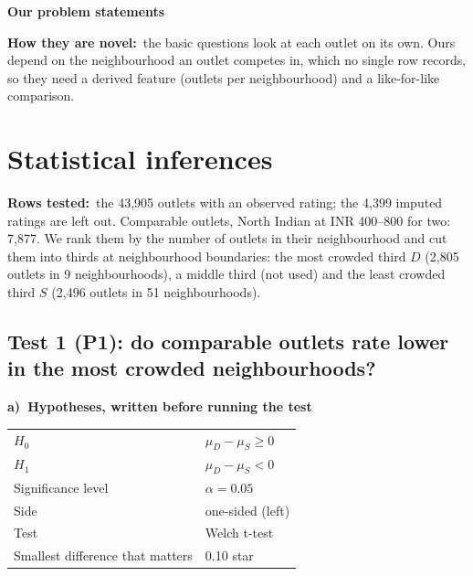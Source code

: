 \documentclass[10pt,a4paper,twocolumn]{article}
\newif\ifshowhints
\newcommand{\hint}[1]{\ifshowhints{\footnotesize\itshape\color{hintgrey}#1\par}\fi}
\newcommand{\eg}[1]{\textcolor{eg}{#1}}
\newcommand{\field}[2]{\textbf{#1}~\eg{#2}\par}
\newcommand{\tpart}[2]{\par\needspace{12\baselineskip}\smallskip\textbf{#1)~#2}\par}
\newcommand{\minihead}[1]{\par\needspace{8\baselineskip}\smallskip\textbf{#1}\par}
\begin{document}
\minihead{Our problem statements}
\hint{One or two sentences each, specific to your features, and phrased so each could come out
either way. Mark one as primary.}

\noindent\fbox{\begin{minipage}{\dimexpr\linewidth-2\fboxsep-2\fboxrule\relax}
\textbf{P1 (primary).} \eg{Among restaurants with comparable cost and cuisine, does rating fall
as the number of competing outlets in the same neighbourhood rises?}

\smallskip
\textbf{P2.} \eg{Within the most crowded neighbourhoods, do outlets that take online orders rate
higher than those that do not?}
\end{minipage}}

\field{How they are novel:}{the basic questions look at each outlet on its own. Ours depend on
the neighbourhood an outlet competes in, which no single row records, so they need a derived
feature (outlets per neighbourhood) and a like-for-like comparison.}

\section{Statistical inferences}
\hint{Conduct 2--3 hypothesis tests on your problem statement(s), each with parts a)--c) below.
Know your tests and the reason for using them, and compare them with other tests.}

\field{Rows tested:}{the 43{,}905 outlets with an observed rating; the 4{,}399 imputed ratings
are left out. Comparable outlets, North Indian at INR 400--800 for two: 7{,}877. We rank them by
the number of outlets in their neighbourhood and cut them into thirds at neighbourhood
boundaries: the most crowded third $D$ (2{,}805 outlets in 9 neighbourhoods), a middle third
(not used) and the least crowded third $S$ (2{,}496 outlets in 51 neighbourhoods).}

\subsection*{Test 1 (P1): do comparable outlets rate lower in the most crowded neighbourhoods?}

\tpart{a}{Hypotheses, written before running the test}
\hint{Before running the test, write the null and alternative hypotheses ($H_0$ carries the
equality), the significance level, one- or two-sided, the test you will use, and the smallest
difference that would matter in the real world.}
{\small
\begin{tabularx}{\linewidth}{@{}K{3.4cm} Y@{}}
\toprule
$H_0$ & \eg{$\mu_D-\mu_S\ge0$} \\
$H_1$ & \eg{$\mu_D-\mu_S<0$} \\
Significance level & \eg{$\alpha=0.05$} \\
Side & \eg{one-sided (left)} \\
Test & \eg{Welch t-test} \\
Smallest difference that matters & \eg{0.10 star} \\
\bottomrule
\end{tabularx}}
\end{document}
